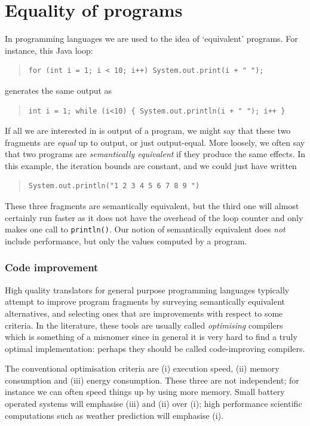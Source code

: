 \section{Equality of programs}
In programming languages we are used to the idea of `equivalent' programs. For instance, this Java loop:
\begin{quote}
\begin{verbatim}
for (int i = 1; i < 10; i++) System.out.print(i + " ");
\end{verbatim}
\end{quote}
generates the same output as 
\begin{quote}
\begin{verbatim}
int i = 1; while (i<10) { System.out.println(i + " "); i++ }
\end{verbatim}
\end{quote}
If all we are interested in is output of a program, we might say that these two fragments are {\em equal} up to output, or just output-equal. More loosely, we often say that two programs are {\em semantically equivalent} if they produce the same effects. In this example, the iteration bounds are constant, and we could just have written
\begin{quote}
\begin{verbatim}
System.out.println("1 2 3 4 5 6 7 8 9 ")
\end{verbatim}
\end{quote}
These three fragments are semantically equivalent, but the third one will almost certainly run faster as it does not have the overhead of the loop counter and only makes one call to {\tt println()}. Our notion of semantically equivalent does {\em not} include performance, but only the values computed by a program.
\subsubsection*{Code improvement}
High quality translators for general purpose programming languages typically attempt to improve program fragments by surveying semantically equivalent alternatives, and selecting ones that are improvements with respect to some criteria. In the literature, these tools are usually called {\em optimising} compilers which is something of a misnomer since in general it is very hard to find a truly optimal implementation: perhaps they should be called code-improving compilers.
 
The conventional optimisation criteria are (i) execution speed, (ii) memory consumption and (iii) energy consumption. These three are not independent; for instance we can often speed things up by using more memory. Small battery operated systems will emphasise (iii) and (ii) over (i); high performance scientific computations such as weather prediction will emphasise (i).

